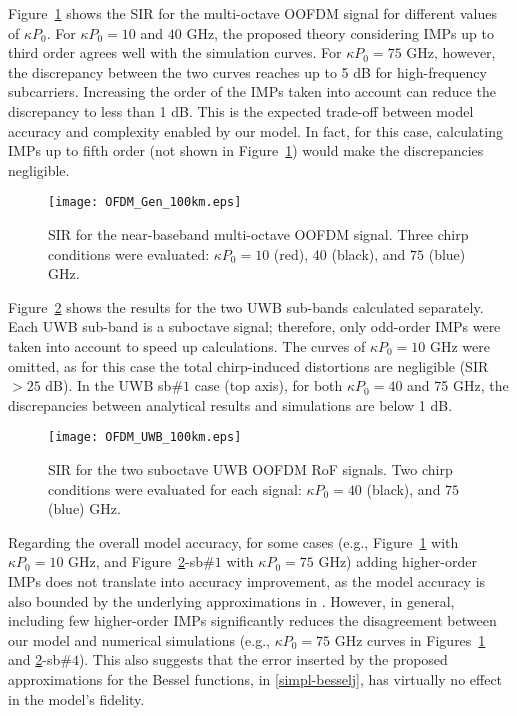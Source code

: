 \documentclass[journal]{IEEEtran}
\begin{document}
Figure~\ref{fig:SIR1} shows the SIR for the multi-octave OOFDM signal for different values of $\kappa P_0$. For $\kappa P_0 = 10$ and $40$ GHz, the proposed theory considering IMPs up to third order agrees well with the simulation curves. For $\kappa P_0 = 75$ GHz, however, the discrepancy between the two curves reaches up to 5 dB for high-frequency subcarriers. Increasing the order of the IMPs taken into account can reduce the discrepancy to less than 1 dB. This is the expected trade-off between model accuracy and complexity enabled by our model. In fact, for this case, calculating IMPs up to fifth order (not shown in Figure~\ref{fig:SIR1}) would make the discrepancies negligible.
\begin{figure}[t]
\centering
\texttt{[image: OFDM\_Gen\_100km.eps]}
\caption{SIR for the near-baseband multi-octave OOFDM signal. Three chirp conditions were evaluated: $\kappa P_0 = 10$ (red), 40 (black), and $75$ (blue) GHz.} \label{fig:SIR1}
\end{figure}

Figure~\ref{fig:SIR2} shows the results for the two UWB sub-bands calculated separately. Each UWB sub-band is a suboctave signal; therefore, only odd-order IMPs were taken into account to speed up calculations. The curves of $\kappa P_0 = 10$ GHz were omitted, as for this case the total chirp-induced distortions are negligible (SIR $> 25$ dB). In the UWB sb$\#1$ case (top axis), for both $\kappa P_0 = 40$ and 75 GHz, the discrepancies between analytical results and simulations are below 1 dB. 
\begin{figure}[t]
\centering
\texttt{[image: OFDM\_UWB\_100km.eps]}
\caption{SIR for the two suboctave UWB OOFDM RoF signals. Two chirp conditions were evaluated for each signal: $\kappa P_0 = 40$ (black), and $75$ (blue) GHz.} \label{fig:SIR2}
\end{figure}
Regarding the overall model accuracy, for some cases (e.g., Figure~\ref{fig:SIR1} with $\kappa P_0 = 10$ GHz, and Figure~\ref{fig:SIR2}-sb$\#1$ with $\kappa P_0 = 75$ GHz) adding higher-order IMPs does not translate into accuracy improvement, as the model accuracy is also bounded by the underlying approximations in \cite{eva}. However, in general, including few higher-order IMPs significantly reduces the disagreement between our model and numerical simulations (e.g., $\kappa P_0 = 75$ GHz curves in Figures~\ref{fig:SIR1} and \ref{fig:SIR2}-sb$\#4$). This also suggests that the error inserted by the proposed approximations for the Bessel functions, in \eqref{simpl-besselj}, has virtually no effect in the model's fidelity.
\end{document}

